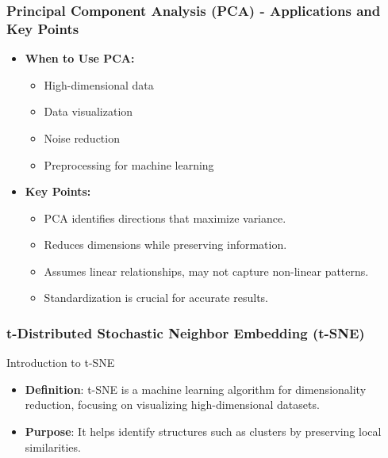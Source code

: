 \documentclass{beamer}
\begin{document}
\begin{frame}[fragile]
    \frametitle{Principal Component Analysis (PCA) - Applications and Key Points}
    \begin{itemize}
        \item \textbf{When to Use PCA:}
        \begin{itemize}
            \item High-dimensional data
            \item Data visualization
            \item Noise reduction
            \item Preprocessing for machine learning
        \end{itemize}
        
        \item \textbf{Key Points:}
        \begin{itemize}
            \item PCA identifies directions that maximize variance.
            \item Reduces dimensions while preserving information.
            \item Assumes linear relationships, may not capture non-linear patterns.
            \item Standardization is crucial for accurate results.
        \end{itemize}
    \end{itemize}
\end{frame}

\begin{frame}[fragile]
    \frametitle{t-Distributed Stochastic Neighbor Embedding (t-SNE)}
    \begin{block}{Introduction to t-SNE}
        \begin{itemize}
            \item \textbf{Definition}: t-SNE is a machine learning algorithm for dimensionality reduction, focusing on visualizing high-dimensional datasets.
            \item \textbf{Purpose}: It helps identify structures such as clusters by preserving local similarities.
        \end{itemize}
    \end{block}
\end{frame}
\end{document}
